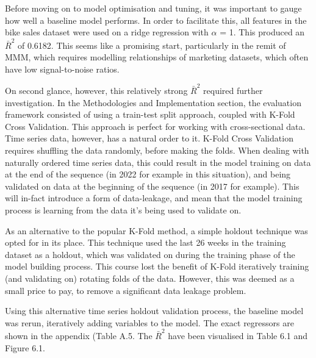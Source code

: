 \documentclass[11pt, a4paper]{article}
\begin{document}
Before moving on to model optimisation and tuning, it was important to gauge how well a baseline model performs. In order to facilitate this, all features in the bike sales dataset were used on a ridge regression with $\alpha$ = 1. This produced an $\bar{R}^2$ of 0.6182. This seems like a promising start, particularly in the remit of MMM, which requires modelling relationships of marketing datasets, which often have low signal-to-noise ratios. 

On second glance, however, this relatively strong $\bar{R}^2$ required further investigation. In the Methodologies and Implementation section, the evaluation framework consisted of using a train-test split approach, coupled with K-Fold Cross Validation. This approach is perfect for working with cross-sectional data. Time series data, however, has a natural order to it. K-Fold Cross Validation requires shuffling the data randomly, before making the folds. When dealing with naturally ordered time series data, this could result in the model training on data at the end of the sequence (in 2022 for example in this situation), and being validated on data at the beginning of the sequence (in 2017 for example). This will in-fact introduce a form of data-leakage, and mean that the model training process is learning from the data it’s being used to validate on. 

As an alternative to the popular K-Fold method, a simple holdout technique was opted for in its place. This technique used the last 26 weeks in the training dataset as a holdout, which was validated on during the training phase of the model building process. This course lost the benefit of K-Fold iteratively training (and validating on) rotating folds of the data. However, this was deemed as a small price to pay, to remove a significant data leakage problem. 

Using this alternative time series holdout validation process, the baseline model was rerun, iteratively adding variables to the model. The exact regressors are shown in the appendix (Table A.5. The $\bar{R}^2$ have been visualised in Table 6.1 and Figure 6.1. 
\end{document}
